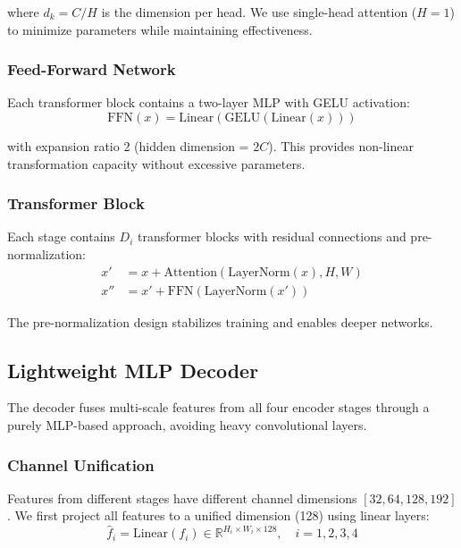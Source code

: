 where $d_k = C / H$ is the dimension per head. We use single-head attention ($H=1$) to minimize parameters while maintaining effectiveness.

\subsubsection{Feed-Forward Network}

Each transformer block contains a two-layer MLP with GELU activation:
\begin{equation}
\text{FFN}(x) = \text{Linear}(\text{GELU}(\text{Linear}(x)))
\end{equation}

with expansion ratio 2 (hidden dimension = $2C$). This provides non-linear transformation capacity without excessive parameters.

\subsubsection{Transformer Block}

Each stage contains $D_i$ transformer blocks with residual connections and pre-normalization:
\begin{align}
x' &= x + \text{Attention}(\text{LayerNorm}(x), H, W) \\
x'' &= x' + \text{FFN}(\text{LayerNorm}(x'))
\end{align}

The pre-normalization design stabilizes training and enables deeper networks.

\subsection{Lightweight MLP Decoder}

The decoder fuses multi-scale features from all four encoder stages through a purely MLP-based approach, avoiding heavy convolutional layers.

\subsubsection{Channel Unification}

Features from different stages have different channel dimensions $[32, 64, 128, 192]$. We first project all features to a unified dimension (128) using linear layers:
\begin{equation}
\hat{f}_i = \text{Linear}(f_i) \in \mathbb{R}^{H_i \times W_i \times 128}, \quad i = 1,2,3,4
\end{equation}

